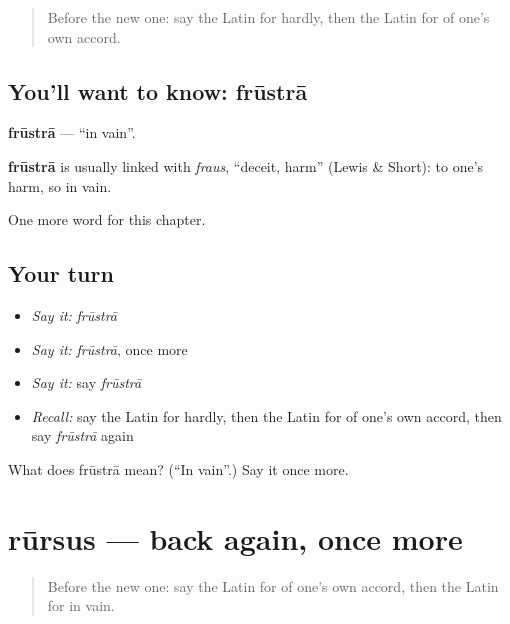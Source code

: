 \label{lesson:LA-C211-frustra}



\begin{quote}
Before the new one: say the Latin for hardly, then the Latin for of one's own accord.
\end{quote}

\subsection*{You'll want to know: frūstrā}
\textbf{frūstrā} — \textquotedblleft{}in vain\textquotedblright{}.

\begin{cousinweb}
\textbf{frūstrā} is usually linked with \emph{fraus}, \textquotedblleft{}deceit, harm\textquotedblright{} (Lewis \& Short): to one's harm, so in vain.
\end{cousinweb}

\begin{grammarlens}[title={What you've built}]
One more word for this chapter.
\end{grammarlens}

\subsection*{Your turn}
\begin{itemize}
\raggedright
  \item \emph{Say it:} \emph{frūstrā}
  \item \emph{Say it:} \emph{frūstrā}, once more
  \item \emph{Say it:} say \emph{frūstrā}
  \item \emph{Recall:} say the Latin for hardly, then the Latin for of one's own accord, then say \emph{frūstrā} again
\end{itemize}

\begin{tcolorbox}[breakable,colback=teal!4,colframe=teal!35!black,title={Before you move on}]
What does frūstrā mean? (\textquotedblleft{}In vain\textquotedblright{}.) Say it once more.
\end{tcolorbox}
\section[rūrsus]{rūrsus — back again, once more}

\label{lesson:LA-C211-rursus}



\begin{quote}
Before the new one: say the Latin for of one's own accord, then the Latin for in vain.
\end{quote}

